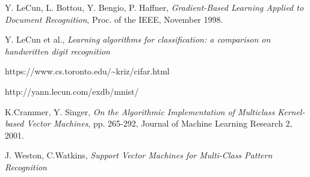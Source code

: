 
\begin{thebibliography}{9}

  Y. LeCun, L. Bottou, Y. Bengio, P. Haffner,
  \emph{Gradient-Based Learning Applied to Document Recognition},
  Proc. of the IEEE,
  November 1998.

  Y. LeCun et al.,
  \emph{Learning algorithms for classification:
  a comparison on handwritten digit recognition}

  https://www.cs.toronto.edu/{\textasciitilde}kriz/cifar.html

  http://yann.lecun.com/exdb/mnist/

  K.Crammer, Y. Singer,
  \emph{On the Algorithmic Implementation of Multiclass Kernel-based Vector Machines},
  pp. 265-292,
  Journal of Machine Learning Research 2,
  2001.

  J. Weston, C.Watkins,
  \emph{Support Vector Machines for Multi-Class Pattern Recognition}
\end{thebibliography}
